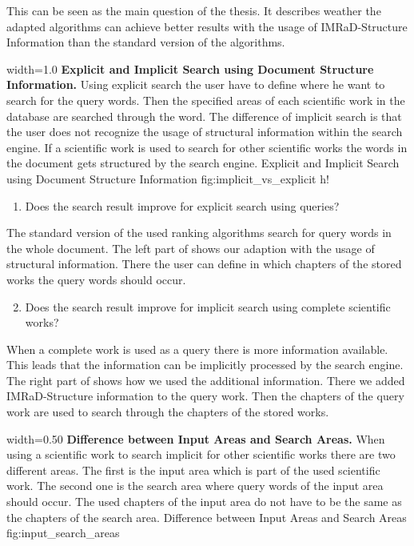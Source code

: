 This can be seen as the main question of the thesis. It describes weather the adapted algorithms can achieve better results with the usage of IMRaD-Structure Information than the standard version of the algorithms.

      {width=1.0\textwidth}
      {\textbf{Explicit and Implicit Search using Document Structure Information.} Using explicit search the user have to define where he want to search for the query words. Then the specified areas of each scientific work in the database are searched through the word. The difference of implicit search is that the user does not recognize the usage of structural information within the search engine. If a scientific work is used to search for other scientific works the words in the document gets structured by the search engine.}
      {Explicit and Implicit Search using Document Structure Information}
      {fig:implicit_vs_explicit}
      {h!}

\begin{enumerate}[label=1.\arabic*]
  \item Does the search result improve for explicit search using queries?
\end{enumerate}

The standard version of the used ranking algorithms search for query words in the whole document. The left part of  shows our adaption with the usage of structural information. There the user can define in which chapters of the stored works the query words should occur.

\begin{enumerate}[label=1.\arabic*]
  \setcounter{enumi}{1}
  \item Does the search result improve for implicit search using complete scientific works?
\end{enumerate}

When a complete work is used as a query there is more information available. This leads that the information can be implicitly processed by the search engine. The right part of  shows how we used the additional information. There we added IMRaD-Structure information to the query work. Then the chapters of the query work are used to search through the chapters of the stored works.

      {width=0.50\textwidth}
      {\textbf{Difference between Input Areas and Search Areas.} When using a scientific work to search implicit for other scientific works there are two different areas. The first is the input area which is part of the used scientific work. The second one is the search area where query words of the input area should occur. The used chapters of the input area do not have to be the same as the chapters of the search area.}
      {Difference between Input Areas and Search Areas}
      {fig:input_search_areas}

